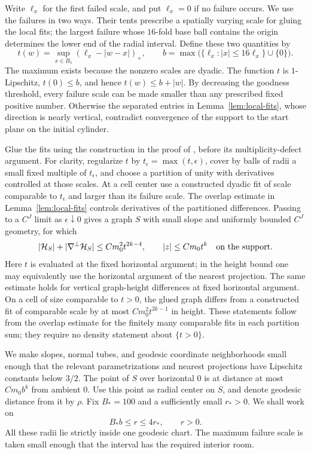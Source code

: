 Write $\ell_x$ for the first failed scale, and put $\ell_x=0$ if no
failure occurs. We use the failures in two ways. Their tents prescribe
a spatially varying scale for gluing the local fits; the largest failure
whose $16$-fold base ball contains the origin determines the lower end
of the radial interval. Define these two quantities by
\begin{equation}\label{eq:tents}
 t(w)=\sup_{x\in B_5}(\ell_x-|w-x|)_+,
 \qquad
 b=\max\bigl(\{\ell_x:|x|\le16\ell_x\}\cup\{0\}\bigr).
\end{equation}
The maximum exists because the nonzero scales are dyadic. The function
$t$ is $1$-Lipschitz, $t(0)\le b$, and hence $t(w)\le b+|w|$.
By decreasing the goodness threshold, every failure scale can be made
smaller than any prescribed fixed positive number. Otherwise the
separated entries in Lemma~\ref{lem:local-fits}, whose direction is
nearly vertical, contradict convergence of the support to the start
plane on the initial cylinder.

Glue the fits using the construction in the proof of
\cite[Proposition~7.3]{AE}, before its multiplicity-defect argument.
For clarity, regularize $t$ by $t_\epsilon=\max(t,\epsilon)$, cover by
balls of radii a small fixed multiple of $t_\epsilon$, and choose a
partition of unity with derivatives controlled at those scales. At a
cell center use a constructed dyadic fit of scale comparable to
$t_\epsilon$ and larger than its failure scale. The overlap estimate
in Lemma~\ref{lem:local-fits} controls derivatives of the partitioned
differences. Passing to a $C^J$ limit as $\epsilon\downarrow0$ gives a
graph $S$ with small slope and uniformly bounded $C^J$ geometry, for which
\begin{equation}\label{eq:glued-center}
 |\mathcal H_S|+|\nabla^\perp\mathcal H_S|
       \le Cm_0^2t^{2k-4},
 \qquad |z|\le Cm_0t^k\quad\hbox{on the support}.
\end{equation}
Here $t$ is evaluated at the fixed horizontal argument; in the height
bound one may equivalently use the horizontal argument of the nearest
projection. The same estimate holds for vertical graph-height
differences at fixed horizontal argument. On a cell of size comparable
to $t>0$, the glued graph differs from a constructed fit of comparable
scale by at most $Cm_0^2t^{2k-1}$ in height. These statements follow
from the overlap estimate for the finitely many comparable fits in
each partition sum; they require no density statement about $\{t>0\}$.

We make slopes, normal tubes, and geodesic coordinate neighborhoods
small enough that the relevant parametrizations and nearest projections
have Lipschitz constants below $3/2$. The point of $S$ over horizontal
$0$ is at distance at most $Cm_0b^k$ from ambient $0$. Use this point
as radial center on $S$, and denote geodesic distance from it by $\rho$.
Fix $B_*=100$ and a sufficiently small $r_*>0$. We shall work on
\begin{equation}\label{eq:fitting-radius-range}
 B_*b\le r\le4r_*,\qquad r>0.
\end{equation}
All these radii lie strictly inside one geodesic chart. The maximum
failure scale is taken small enough that the interval has the required
interior room.


